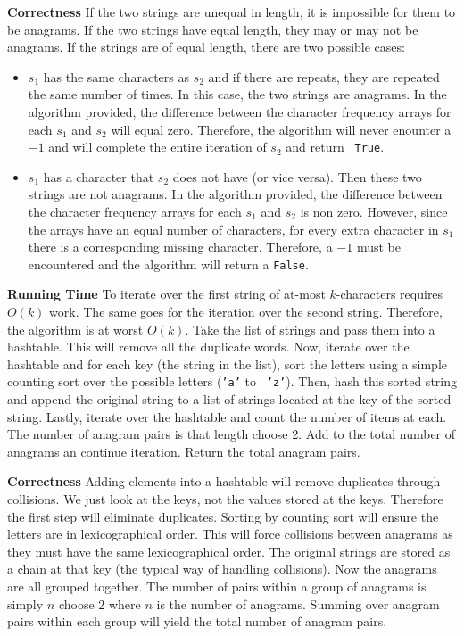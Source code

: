 \documentclass[12pt,twoside]{article}
\begin{document}
\begin{problems}
\begin{problemparts}
    {\bf Correctness} If the two strings are unequal in length, it is
    impossible for them to be anagrams. If the two strings have equal length,
    they may or may not be anagrams. If the strings are of equal length,
    there are two possible cases:
    \begin{itemize}
        \item $s_1$ has the same characters as $s_2$ and if there are
        repeats, they are repeated the same number of times. In this case,
        the two strings are anagrams. In the algorithm provided, the
        difference between the character frequency arrays for each $s_1$ and
        $s_2$ will equal zero. Therefore, the algorithm will never enounter a
        $-1$ and will complete the entire iteration of $s_2$ and return {\tt
        True}.
        \item $s_1$ has a character that $s_2$ does not have (or vice versa).
        Then these two strings are not anagrams. In the algorithm provided,
        the difference between the character frequency arrays for each $s_1$
        and $s_2$ is non zero. However, since the arrays have an equal number
        of characters, for every extra character in $s_1$ there is a
        corresponding missing character. Therefore, a $-1$ must be
        encountered and the algorithm will return a {\tt False}.
    \end{itemize}

    {\bf Running Time} To iterate over the first string of at-most
    $k$-characters requires $O(k)$ work. The same goes for the iteration over
    the second string. Therefore, the algorithm is at worst $O(k)$.
 Take the list of strings and pass them into a
    hashtable. This will remove all the duplicate words. Now, iterate over
    the hashtable and for each key (the string in the list), sort the letters
    using a simple counting sort over the possible letters ({\tt 'a'} to {\tt
    'z'}). Then, hash this sorted string and append the original string to a
    list of strings located at the key of the sorted string. Lastly, iterate
    over the hashtable and count the number of items at each. The number of
    anagram pairs is that length choose 2. Add to the total number of
    anagrams an continue iteration. Return the total anagram pairs.

    {\bf Correctness} Adding elements into a hashtable will remove duplicates
    through collisions. We just look at the keys, not the values stored at
    the keys. Therefore the first step will eliminate duplicates. Sorting by
    counting sort will ensure the letters are in lexicographical order. This
    will force collisions between anagrams as they must have the same
    lexicographical order. The original strings are stored as a chain at that
    key (the typical way of handling collisions). Now the anagrams are all
    grouped together. The number of pairs within a group of anagrams is
    simply $n$ choose $2$ where $n$ is the number of anagrams. Summing over
    anagram pairs within each group will yield the total number of anagram
    pairs.


\end{problemparts}
\end{problems}
\end{document}
